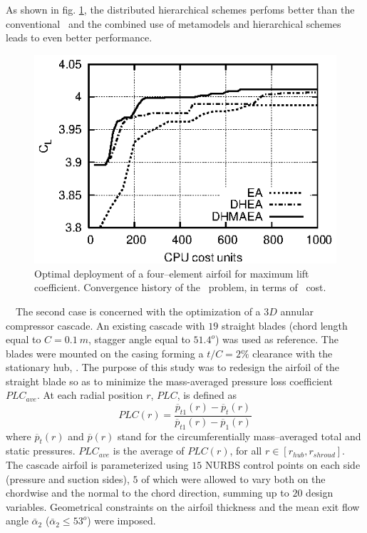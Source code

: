 \documentclass{vki_ls}
\newcommand{\xeraki}{\Pisymbol{ding}{13}~~}
\begin{document}
As shown in fig. \ref{f:dhea}, the distributed hierarchical schemes perfoms better than the conventional \EA\ and the combined use of metamodels and hierarchical schemes leads to even better performance.
%
\begin{figure}[ht!]
    \centering
    \includegraphics[scale=1.5]{hmaeas/4elemEaDhea.eps}
    \caption{Optimal deployment of a four--element airfoil for maximum lift 
	     coefficient. Convergence history of the \SOO\ problem, in terms 
	     of \CPU\ cost.}
    \label{f:dhea}
\end{figure}
%


%
%
\xeraki The second case is concerned with the optimization of a $3D$ annular compressor cascade. 
An existing cascade with $19$ straight blades (chord length equal to $C\!\!=\!\!0.1~m$, stagger angle equal to $51.4^o$) was used as reference. 
The blades were mounted on the casing forming a $t/C\!=\!2\%$ clearance with the stationary hub, \cite{LTT_4_05}. 
The purpose of this study was to redesign the airfoil of the straight blade so as to minimize the mass-averaged pressure loss coefficient $PLC_{ave}$. At each radial position $r$, $PLC$, is defined as
%
\begin{equation}\label{omloss}
    PLC(r) = \frac{ \overline{p}_{t1}(r) - \overline{p}_t(r) }
                  { \overline{p}_{t1}(r) - \overline{p}_{1}(r) }
    \nonumber
\end{equation}
%
where $\overline{p}_{t}(r)$ and $\overline{p}(r)$ stand for the circumferentially mass--averaged total and static pressures.
$PLC_{ave}$ is the average of $PLC(r)$, for all $r\in[r_{hub},r_{shroud}]$.
The cascade airfoil is parameterized using $15$ NURBS control points on each side (pressure and suction sides), $5$ of which were allowed to vary both on the chordwise and the normal to the chord direction, summing up to $20$ design variables.
Geometrical constraints on the airfoil thickness and the mean exit flow angle $\bar{\alpha}_2$ ($\bar{\alpha}_2\!\leq\!53^o$) were imposed.
\end{document}
